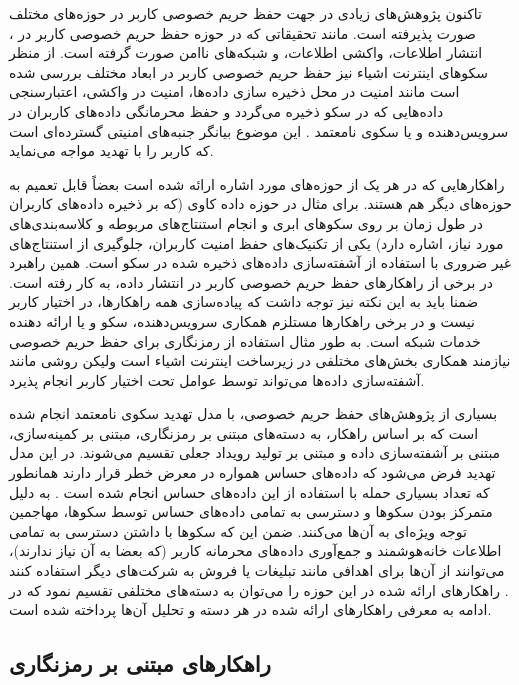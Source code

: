 تاکنون پژوهش‌های زیادی در جهت حفظ حریم خصوصی کاربر در حوزه‌‌‌های مختلف صورت پذیرفته است. مانند تحقیقاتی که در حوزه حفظ حریم خصوصی کاربر در ، انتشار اطلاعات، واکشی اطلاعات، و شبکه‌‌‌های نا‌‌‌امن صورت گرفته است. از منظر سکوهای اینترنت اشياء نیز حفظ حریم خصوصی کاربر در ابعاد مختلف بررسی شده است مانند امنيت در محل ذخیره سازی داده‌‌‌ها، امنيت در واکشی، اعتبارسنجی داده‌‌‌هایی که در سکو ذخیره می‌‌‌گردد و حفظ محرمانگی داده‌های کاربران در سرويس‌دهنده و يا سکوی نامعتمد \cite{x301}. این موضوع بیانگر جنبه‌‌‌های امنيتی گسترده‌ای است که کاربر را با تهدید مواجه می‌نماید. 

راهکارهایی که در هر یک از حوزه‌های مورد اشاره ارائه شده است بعضاً قابل تعمیم به حوزه‌‌‌های دیگر هم هستند. برای مثال در حوزه داده کاوی (که بر ذخیره داده‌‌‌های کاربران در طول زمان بر روی سکوهای ابری و انجام استنتاج‌‌‌های مربوطه و کلاسه‌بندی‌‌‌های مورد نیاز، اشاره دارد) یکی از تکنیک‌های حفظ امنیت کاربران، جلوگیری از استنتاج‌‌‌های غیر ضروری با استفاده از آشفته‌سازی داده‌‌‌های ذخیره شده در سکو است. همین راهبرد در برخی از راهکارهای حفظ حریم خصوصی کاربر در انتشار داده، به کار رفته است. ضمنا باید به این نکته نیز توجه داشت که پیاده‌‌‌سازی همه راهکارها، در اختیار کاربر نیست و در برخی راهکارها مستلزم همکاری سرویس‌دهنده، سکو و یا ارائه دهنده خدمات شبکه است. به طور مثال استفاده از رمزنگاری برای حفظ حریم خصوصی نیازمند همکاری بخش‌های مختلفی در زیرساخت اینترنت اشیاء است ولیکن روشی مانند آشفته‌سازی داده‌ها می‌تواند توسط عوامل تحت اختیار کاربر انجام پذیرد.

بسیاری از پژوهش‌های حفظ حریم خصوصی، با مدل تهدید سکوی نامعتمد انجام شده است که بر اساس راهکار، به دسته‌های مبتنی بر رمزنگاری، مبتنی بر کمینه‌سازی، مبتنی بر آشفته‌سازی داده و مبتنی بر تولید رویداد جعلی تقسیم می‌شوند. در این مدل تهدید فرض می‌شود که داده‌های حساس همواره در معرض خطر قرار دارند همانطور که تعداد بسیاری حمله با استفاده از این داده‌های حساس انجام شده است \cite{x3301,x3302}. به دلیل متمرکز بودن سکوها و دسترسی به تمامی داده‌های حساس توسط سکوها، مهاجمین توجه ویژه‌ای به آن‌ها می‌کنند. ضمن این که سکوها با داشتن دسترسی به تمامی اطلاعات خانه‌هوشمند و جمع‌آوری داده‌‌‌های محرمانه کاربر (که بعضا به آن نیاز ندارند)، می‌توانند از آن‌ها برای اهدافی مانند تبلیغات یا فروش به شرکت‌های دیگر استفاده کنند \cite{x3303,x3304}. راهکارهای ارائه شده در این حوزه را می‌توان به دسته‌های مختلفی تقسیم نمود که در ادامه به معرفی راهکارهای ارائه شده در هر دسته و تحلیل آن‌ها پرداخته شده است.

\subsection{راهکارهای مبتنی بر رمزنگاری}

